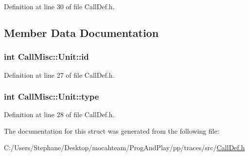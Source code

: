 Definition at line 30 of file Call\+Def.\+h.



\subsection{Member Data Documentation}
\subsubsection[{\texorpdfstring{id}{id}}]{\setlength{\rightskip}{0pt plus 5cm}int Call\+Misc\+::\+Unit\+::id}\hypertarget{struct_call_misc_1_1_unit_a754d287891f0b60ba9f4326116901f69}{}\label{struct_call_misc_1_1_unit_a754d287891f0b60ba9f4326116901f69}


Definition at line 27 of file Call\+Def.\+h.

\subsubsection[{\texorpdfstring{type}{type}}]{\setlength{\rightskip}{0pt plus 5cm}int Call\+Misc\+::\+Unit\+::type}\hypertarget{struct_call_misc_1_1_unit_ae32746bb6f392f97ac2f8cc682e5991b}{}\label{struct_call_misc_1_1_unit_ae32746bb6f392f97ac2f8cc682e5991b}


Definition at line 28 of file Call\+Def.\+h.



The documentation for this struct was generated from the following file\+:\begin{DoxyCompactItemize}
\item 
C\+:/\+Users/\+Stephane/\+Desktop/mocahteam/\+Prog\+And\+Play/pp/traces/src/\hyperlink{_call_def_8h}{Call\+Def.\+h}\end{DoxyCompactItemize}
